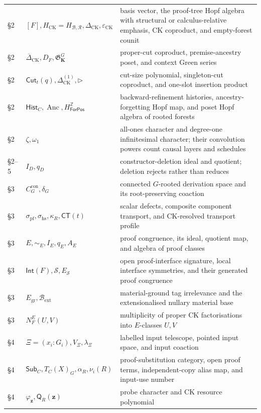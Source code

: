 \documentclass[10pt,a4paper]{article}
\theoremstyle{plain}
\theoremstyle{definition}
\theoremstyle{remark}
\newcommand{\Base}{\mathcal B}
\newcommand{\Rules}{\mathcal R}
\newcommand{\HCK}{H_{\mathrm{CK}}}
\newcommand{\Hlic}{H_{\Base,\Rules}}
\newcommand{\DeltaCK}{\Delta_{\mathrm{CK}}}
\newcommand{\epsCK}{\varepsilon_{\mathrm{CK}}}
\begin{document}
\begin{longtable}{@{}L{1.35cm}L{4.15cm}L{9.55cm}@{}}
\S2 & \([F],\HCK=\Hlic,\DeltaCK,\epsCK\) & basis vector, the proof-tree Hopf algebra with structural or calculus-relative emphasis, CK coproduct, and empty-forest counit\\
\S2 & \(\overline\Delta_{\mathrm{CK}},D_F,\mathfrak G^G_{\mathbf K}\) & proper-cut coproduct, premise-ancestry poset, and context Green series\\
\S2 & \(\mathsf{Cut}_t(q),\Delta_{\mathrm{CK}}^{(1)},\triangleright\) & cut-size polynomial, singleton-cut coproduct, and one-slot insertion product\\
\S2 & \(\mathsf{Hist}_C,\operatorname{Anc},H^{\mathbb Z}_{\mathsf{ForPos}}\) & backward-refinement histories, ancestry-forgetting Hopf map, and poset Hopf algebra of rooted forests\\
\S2 & \(\zeta,\omega_1\) & all-ones character and degree-one infinitesimal character; their convolution powers count causal layers and schedules\\
\S2--5 & \(I_D,q_D\) & constructor-deletion ideal and quotient; deletion rejects rather than reduces\\
\S3 & \(C_G^{\mathrm{con}},\delta_G\) & connected \(G\)-rooted derivation space and its root-preserving coaction\\
\S3 & \(\sigma_{\mathrm{pf}},\sigma_{\mathrm{hs}},\kappa_R,\mathsf{CT}(t)\) & scalar defects, composite component transport, and CK-resolved transport profile\\
\S3 & \(E,\sim_E,I_E,q_E,A_E\) & proof congruence, its ideal, quotient map, and algebra of proof classes\\
\S3 & \(\mathsf{Int}(F),\mathcal S,E_{\mathcal S}\) & open proof-interface signature, local interface symmetries, and their generated proof congruence\\
\S3 & \(E_{\mathrm{gr}},\Base_{\mathrm{ext}}\) & material-ground tag irrelevance and the extensionalised nullary material base\\
\S3 & \(N_F^E(U,V)\) & multiplicity of proper CK factorisations into \(E\)-classes \(U,V\)\\
\S4 & \(\Xi=(x_i:G_i),V_\Xi,\lambda_\Xi\) & labelled input telescope, pointed input space, and input coaction\\
\S4 & \(\mathsf{Sub}_C,T_C(X)_G,\alpha_R,\nu_i(R)\) & proof-substitution category, open proof terms, independent-copy alias map, and input-use number\\
\S4 & \(\varphi_{\mathbf z},\mathsf Q_R(\mathbf z)\) & probe character and CK resource polynomial\\

\end{longtable}
\end{document}
